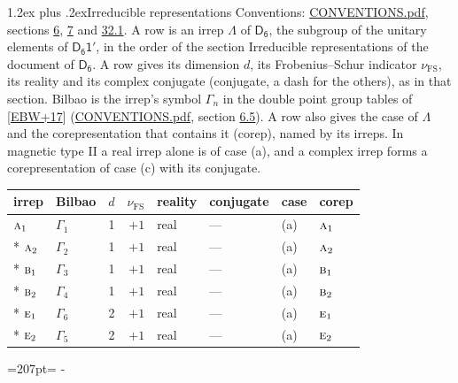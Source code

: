 \documentclass[10pt,a4paper]{article}
\makeatletter
\renewcommand\section{\@startsection{section}{1}{\z@}{-3ex plus -1ex minus -.2ex}%
  {1.2ex plus .2ex}{\normalfont\large\sffamily\bfseries\color{parttitle}}}
\newcommand{\needspace}[1]{\par\penalty-100\begingroup\dimen0=#1\relax\dimen2=\pagegoal
  \advance\dimen2-\pagetotal\ifdim\dimen0>\dimen2\relax\ifdim\dimen2>0pt\vfil\break\fi\fi
  \endgroup}
\numberwithin{equation}{section}
\newcommand{\grp}[1]{\mathsf{#1}}
\newcommand{\irr}[1]{\text{\normalfont\scshape #1}}
\newcommand{\fsind}{\nu_{\mathrm{FS}}}
\makeatother
\begin{document}
\section{Irreducible representations}\label{s:irreps}
Conventions: \href{../../CONVENTIONS.pdf}{CONVENTIONS.pdf}, sections \href{../../../rotation/CONVENTIONS.pdf\#conv.6}{6}, \href{../../../rotation/CONVENTIONS.pdf\#conv.7}{7} and \href{../../CONVENTIONS.pdf\#conv.32.1}{32.1}.
\leavevmode\label{n:irrep.Delta}A row is an irrep $\Lambda$ of $\grp{D_{6}}$, the subgroup of the unitary elements of $\grp{D_{6}1'}$, in the order of the section Irreducible representations of the document of \href{../../../rotation/data/pdf/D6.pdf}{$\grp{D_{6}}$}. \label{n:index.dimension}\label{n:index.frobenius}\label{n:head.irrep}\label{n:head.reality}\label{n:head.conjugate}A row gives its dimension $d$, its Frobenius--Schur indicator $\fsind$, its reality and its complex conjugate (conjugate, a dash for the others), as in that section. \label{n:head.bilbao}\label{n:irrep.alias.gamma}Bilbao is the irrep's symbol $\Gamma_n$ in the double point group tables of [\href{../../../REFERENCES.pdf\#ref.EBW+17}{EBW+17}] (\href{../../CONVENTIONS.pdf}{CONVENTIONS.pdf}, section \href{../../../rotation/CONVENTIONS.pdf\#conv.6.5}{6.5}). \label{n:head.case.corep}\label{n:head.corep}A row also gives the case of $\Lambda$ and the corepresentation that contains it (corep), named by its irreps. In magnetic type II a real irrep alone is of case (a), and a complex irrep forms a corepresentation of case (c) with its conjugate.
\setlength{\emergencystretch}{2em}\par\setlength{\emergencystretch}{0pt}
{\small\renewcommand{\arraystretch}{1.25}\setlength{\tabcolsep}{4pt}\begin{longtable}{@{}llrrllll@{}}\toprule
irrep & Bilbao & $d$ & $\fsind$ & reality & conjugate & case & corep\\\midrule\endhead
\bottomrule\endfoot\endlastfoot
$\irr{a}_{1}$ & $\Gamma_{1}$ & 1 & $+1$ & real & --- & (a) & $\irr{a}_{1}$\\*
$\irr{a}_{2}$ & $\Gamma_{2}$ & 1 & $+1$ & real & --- & (a) & $\irr{a}_{2}$\\*
$\irr{b}_{1}$ & $\Gamma_{3}$ & 1 & $+1$ & real & --- & (a) & $\irr{b}_{1}$\\*
$\irr{b}_{2}$ & $\Gamma_{4}$ & 1 & $+1$ & real & --- & (a) & $\irr{b}_{2}$\\*
$\irr{e}_{1}$ & $\Gamma_{6}$ & 2 & $+1$ & real & --- & (a) & $\irr{e}_{1}$\\*
$\irr{e}_{2}$ & $\Gamma_{5}$ & 2 & $+1$ & real & --- & (a) & $\irr{e}_{2}$\\
\bottomrule\end{longtable}}
\needspace{207pt}
\end{document}
